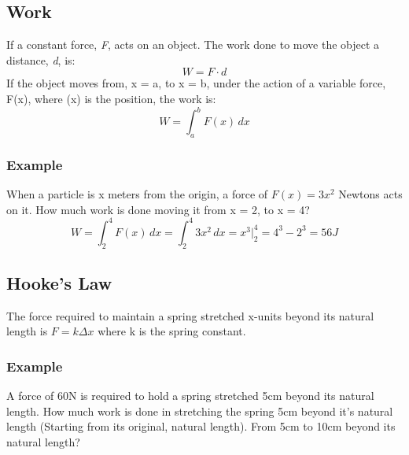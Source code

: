 \documentclass[12pt, letterpaper]{article}
\begin{document}
    \subsection*{Work}
        If a constant force, \textit{F}, acts on an object. The work done to move the object a distance, \textit{d}, is:
        \begin{equation}
            W = F\cdot d
        \end{equation}
        If the object moves from, x = a, to x = b, under the action of a variable force, F(x), where (x) is the position, the work is:
        \begin{equation}
            W = \int_a^bF(x)\,dx
        \end{equation}
    \subsubsection*{Example}
        When a particle is x meters from the origin, a force of $F(x) = 3x^2$ Newtons acts on it. How much work is done moving it from x = 2, to x = 4?
        \begin{equation*}
            W = \int_2^4F(x)\,dx = \int_2^4 3x^2\,dx
            = x^3\big|_2^4 = 4^3 - 2^3 = 56J
        \end{equation*}
    \subsection*{Hooke's Law}
    The force required to maintain a spring stretched x-units beyond its natural length is $F=k\Delta x$ where k is the spring constant. 
    
    \subsubsection*{Example}
        A force of 60N is required to hold a spring stretched 5cm beyond its natural length. How much work is 
        done in stretching the spring 5cm beyond it's natural length (Starting from its original, natural length). From 5cm to 10cm beyond its natural length?
        
\end{document}
